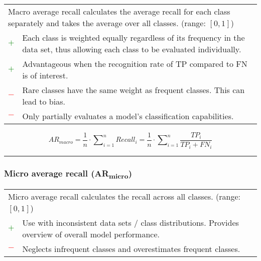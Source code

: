 \documentclass{article}
\begin{document}
\begin{table}[H]\centering
	\begin{tabular}{m{}m{}}
		\multicolumn{2}{m{0.95\textwidth}}{Macro average recall calculates the average recall for each class separately and takes the average over all classes. (range: $[0, 1]$)} \\
		\textcolor{Green}{$+$} & Each class is weighted equally regardless of its frequency in the data set, thus allowing each class to be evaluated individually. \\
		\textcolor{Green}{$+$} & Advantageous when the recognition rate of TP compared to FN is of interest. \\
		\textcolor{Red}{$-$}   & Rare classes have the same weight as frequent classes. This can lead to bias. \\
		\textcolor{Red}{$-$}   & Only partially evaluates a model's classification capabilities.
	\end{tabular}
\end{table}

\begin{equation}
	\textit{AR}_\textit{macro} = \dfrac{1}{n} \cdot \sum\nolimits_{i = 1}^n \textit{Recall}_i = \dfrac{1}{n} \cdot \sum\nolimits_{i = 1}^n \dfrac{\textit{TP}_i}{\textit{TP}_i + \textit{FN}_i}
%
	\label{equation:MAAR}
\end{equation}

\hrule


\subsubsection[Micro average recall (ARmicro)]{Micro average recall (AR\textsubscript{micro}) \cite{yang1999evaluation, sebastiani2002machine}}

\begin{table}[H]\centering
	\begin{tabular}{m{}m{}}
		\multicolumn{2}{m{0.95\textwidth}}{Micro average recall calculates the recall across all classes. (range: $[0, 1]$)} \\
		\textcolor{Green}{$+$} & Use with inconsistent data sets / class distributions. Provides overview of overall model performance. \\
		\textcolor{Red}{$-$}   & Neglects infrequent classes and overestimates frequent classes.
	\end{tabular}
\end{table}
\end{document}
